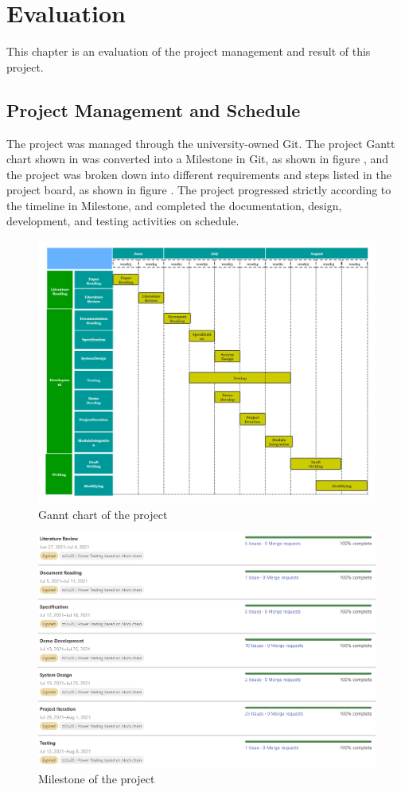 \chapter{Evaluation}
This chapter is an evaluation of the project management and result of this project.
\section{Project Management and Schedule}
The project was managed through the university-owned Git. The project Gantt chart shown in  was converted into a Milestone in Git, as shown in figure , and the project was broken down into different requirements and steps listed in the project board, as shown in figure . The project progressed strictly according to the timeline in Milestone, and completed the documentation, design, development, and testing activities on schedule.
\begin{figure}[H]
    \centering
    \includegraphics[width= .7 \textwidth]{img/gant.png}
    \caption{Gannt chart of the project}
    \label{fig:gannt}
\end{figure}
\begin{figure}[H]
    \centering
    \includegraphics[width= .8 \textwidth]{img/milestone.png}
    \caption{Milestone of the project}
    \label{fig:milestone}
\end{figure}
